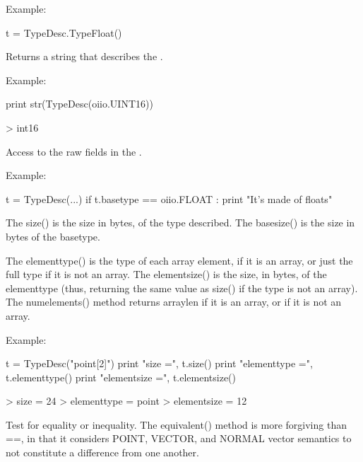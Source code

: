 \noindent Example:
\begin{code}
    t = TypeDesc.TypeFloat()
\end{code}
\apiend

Returns a string that describes the \TypeDesc.

\noindent Example:
\begin{code}
    print str(TypeDesc(oiio.UINT16))

    > int16
\end{code}
\apiend

Access to the raw fields in the \TypeDesc.

\noindent Example:
\begin{code}
    t = TypeDesc(...)
    if t.basetype == oiio.FLOAT :
        print "It's made of floats"
\end{code}
\apiend

The {\cf size()} is the size in bytes, of the type described.  The
{\cf basesize()} is the size in bytes of the {\cf basetype}.

The {\cf elementtype()} is the type of each array element, if it is an
array, or just the full type if it is not an array.  The {\cf elementsize()}
is the size, in bytes, of the {\cf elementtype} (thus, returning the same
value as {\cf size()} if the type is not an array).  The {\cf numelements()}
method returns {\cf arraylen} if it is an array, or {} if it is not
an array.

\noindent Example:
\begin{code}
    t = TypeDesc("point[2]")
    print "size =", t.size()
    print "elementtype =", t.elementtype()
    print "elementsize =", t.elementsize()

    > size = 24
    > elementtype = point
    > elementsize = 12
\end{code}
\apiend

Test for equality or inequality.  The {\cf equivalent()} method is more
forgiving than {\cf ==}, in that it considers {\cf POINT}, {\cf VECTOR},
and {\cf NORMAL} vector semantics to not constitute a difference from one
another.

